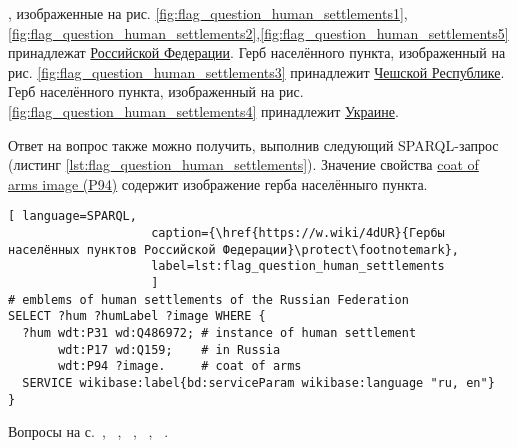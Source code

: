 \begin{task}
\label{answer:flag_human_settlements}
, изображенные на рис. \ref{fig:flag_question_human_settlements1},\ref{fig:flag_question_human_settlements2},\ref{fig:flag_question_human_settlements5} принадлежат \href{https://w.wiki/myt}{Российской Федерации}. Герб населённого пункта, изображенный на рис. \ref{fig:flag_question_human_settlements3} принадлежит \href{https://w.wiki/4dUc}{Чешской Республике}. Герб населённого пункта, изображенный на рис. \ref{fig:flag_question_human_settlements4} принадлежит \href{https://w.wiki/4dUf}{Украине}. 

Ответ на вопрос также можно получить, выполнив следующий SPARQL-запрос (листинг \ref{lst:flag_question_human_settlements}). Значение свойства \href{https://www.wikidata.org/wiki/Property:P94}{coat of arms image (P94)} содержит изображение герба населённыго пункта.
    
\begin{lstlisting}[ language=SPARQL, 
                    caption={\href{https://w.wiki/4dUR}{Гербы населённых пунктов Российской Федерации}\protect\footnotemark},
                    label=lst:flag_question_human_settlements
                    ]
# emblems of human settlements of the Russian Federation
SELECT ?hum ?humLabel ?image WHERE {
  ?hum wdt:P31 wd:Q486972; # instance of human settlement
       wdt:P17 wd:Q159;    # in Russia
       wdt:P94 ?image.     # coat of arms
  SERVICE wikibase:label{bd:serviceParam wikibase:language "ru, en"}
}
\end{lstlisting}

\small{Вопросы на с.~\pageref{fig:flag_question_human_settlements1}, ~\pageref{fig:flag_question_human_settlements2}, ~\pageref{fig:flag_question_human_settlements3}, ~\pageref{fig:flag_question_human_settlements4}, ~\pageref{fig:flag_question_human_settlements5}.}
\end{task}
